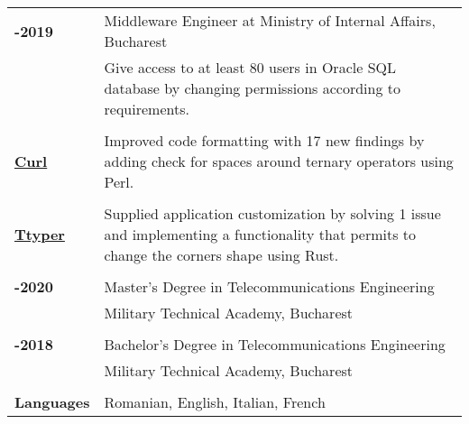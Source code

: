 \documentclass[a4paper,12pt]{article}
\begin{document}
\begin{tabular}{>{\raggedleft\bfseries\arraybackslash}p{3cm}|>{\raggedright\arraybackslash}p{15cm}}
  2018-2019 & Middleware Engineer at Ministry of Internal Affairs, Bucharest\\
  &\footnotesize{Give access to at least 80 users in Oracle SQL database by changing permissions according to requirements.}\\
  \\
    \href{https://github.com/curl/curl}{Curl} & \footnotesize{Improved code formatting with 17 new findings by adding check for spaces around ternary operators using Perl.}\\
    \\
    \href{https://github.com/max-niederman/ttyper}{Ttyper} & \footnotesize{Supplied application customization by solving 1 issue and implementing a functionality that permits to change the corners shape using Rust.}\\
    \\
  2018-2020 & Master's Degree in Telecommunications Engineering \\
  & Military Technical Academy, Bucharest \\
  \\
  2014-2018 & Bachelor's Degree in Telecommunications Engineering \\
  & Military Technical Academy, Bucharest\\
  \\
    Languages & Romanian, English, Italian, French
\end{tabular}
\end{document}
